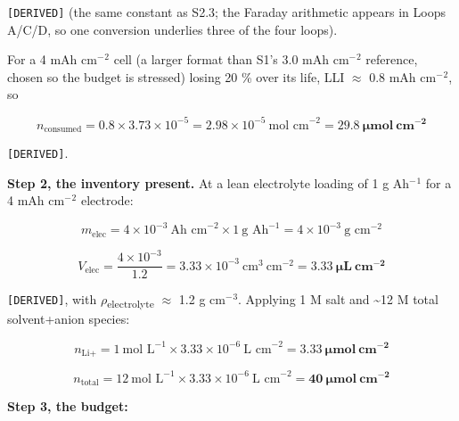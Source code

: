 \documentclass[11pt,a4paper]{article}
\begin{document}
\texttt{[DERIVED]} (the same constant as S2.3; the Faraday arithmetic appears in Loops A/C/D, so one conversion underlies three of the four loops).


For a 4 mAh cm\ensuremath{^{-}}\ensuremath{^{2}} cell (a larger format than S1's 3.0 mAh cm\ensuremath{^{-}}\ensuremath{^{2}} reference, chosen so the budget is stressed) losing 20 \% over its life, LLI \ensuremath{\approx} 0.8 mAh cm\ensuremath{^{-}}\ensuremath{^{2}}, so


\begin{equation}n_{\text{consumed}} = 0.8 \times 3.73\times10^{-5} = 2.98\times10^{-5}\ \text{mol cm}^{-2} = \mathbf{29.8\ \mu mol\ cm^{-2}} \tag{S2.17}\end{equation}


\texttt{[DERIVED]}.


\textbf{Step 2, the inventory present.} At a lean electrolyte loading of 1 g Ah\ensuremath{^{-}}\ensuremath{^{1}} for a 4 mAh cm\ensuremath{^{-}}\ensuremath{^{2}} electrode:


\begin{equation}m_{\text{elec}} = 4\times10^{-3}\ \text{Ah cm}^{-2}\times1\ \text{g Ah}^{-1} = 4\times10^{-3}\ \text{g cm}^{-2} \nonumber\end{equation}


\begin{equation}V_{\text{elec}} = \frac{4\times10^{-3}}{1.2} = 3.33\times10^{-3}\ \text{cm}^{3}\ \text{cm}^{-2} = \mathbf{3.33\ \mu L\ cm^{-2}} \tag{S2.18}\end{equation}


\texttt{[DERIVED]}, with \ensuremath{\rho}\textsubscript{electrolyte} \ensuremath{\approx} 1.2 g cm\ensuremath{^{-}}\ensuremath{^{3}}. Applying 1 M salt and \textasciitilde{}12 M total solvent+anion species:


\begin{equation}n_{\text{Li+}} = 1\ \text{mol L}^{-1}\times3.33\times10^{-6}\ \text{L cm}^{-2} = \mathbf{3.33\ \mu mol\ cm^{-2}} \tag{S2.19}\end{equation}


\begin{equation}n_{\text{total}} = 12\ \text{mol L}^{-1}\times3.33\times10^{-6}\ \text{L cm}^{-2} = \mathbf{40\ \mu mol\ cm^{-2}} \tag{S2.20}\end{equation}


\textbf{Step 3, the budget:}
\end{document}

